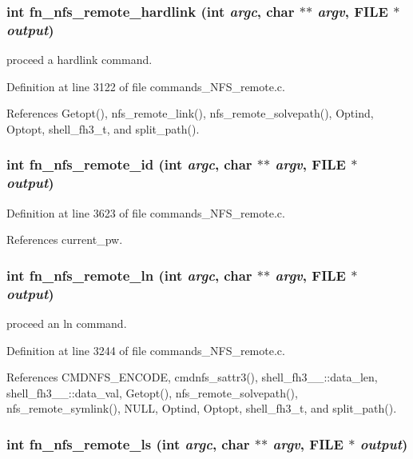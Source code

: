 \subsubsection{\setlength{\rightskip}{0pt plus 5cm}int fn\_\-nfs\_\-remote\_\-hardlink (int {\em argc}, char $\ast$$\ast$ {\em argv}, FILE $\ast$ {\em output})}\label{commands_8h_a96}


proceed a hardlink command. 

Definition at line 3122 of file commands\_\-NFS\_\-remote.c.

References Getopt(), nfs\_\-remote\_\-link(), nfs\_\-remote\_\-solvepath(), Optind, Optopt, shell\_\-fh3\_\-t, and split\_\-path().
\subsubsection{\setlength{\rightskip}{0pt plus 5cm}int fn\_\-nfs\_\-remote\_\-id (int {\em argc}, char $\ast$$\ast$ {\em argv}, FILE $\ast$ {\em output})}\label{commands_8h_a100}




Definition at line 3623 of file commands\_\-NFS\_\-remote.c.

References current\_\-pw.
\subsubsection{\setlength{\rightskip}{0pt plus 5cm}int fn\_\-nfs\_\-remote\_\-ln (int {\em argc}, char $\ast$$\ast$ {\em argv}, FILE $\ast$ {\em output})}\label{commands_8h_a97}


proceed an ln command. 

Definition at line 3244 of file commands\_\-NFS\_\-remote.c.

References CMDNFS\_\-ENCODE, cmdnfs\_\-sattr3(), shell\_\-fh3\_\-\_\-::data\_\-len, shell\_\-fh3\_\-\_\-::data\_\-val, Getopt(), nfs\_\-remote\_\-solvepath(), nfs\_\-remote\_\-symlink(), NULL, Optind, Optopt, shell\_\-fh3\_\-t, and split\_\-path().
\subsubsection{\setlength{\rightskip}{0pt plus 5cm}int fn\_\-nfs\_\-remote\_\-ls (int {\em argc}, char $\ast$$\ast$ {\em argv}, FILE $\ast$ {\em output})}\label{commands_8h_a87}


